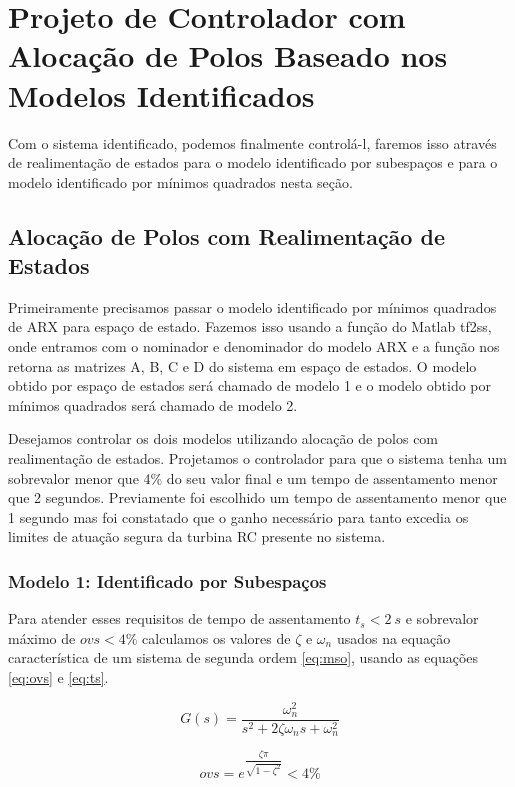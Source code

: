 \chapter{Projeto de Controlador com Alocação de Polos Baseado nos Modelos Identificados} \label{cap5}
Com o sistema identificado, podemos finalmente controlá-l, faremos isso através de realimentação de estados para o modelo identificado por subespaços e para o modelo identificado por mínimos quadrados nesta seção.
\section{Alocação de Polos com Realimentação de Estados}
Primeiramente precisamos passar o modelo identificado por mínimos quadrados de ARX para espaço de estado. Fazemos isso usando a função do Matlab tf2ss, onde entramos com o nominador e denominador do modelo ARX e a função nos retorna as matrizes A, B, C e D do sistema em espaço de estados. O modelo obtido por espaço de estados será chamado de modelo 1 e o modelo obtido por mínimos quadrados será chamado de modelo 2.


Desejamos controlar os dois modelos utilizando alocação de polos com realimentação de estados. Projetamos o controlador para que o sistema tenha um sobrevalor menor que 4\% do seu valor final e um tempo de assentamento menor que 2 segundos. Previamente foi escolhido um tempo de assentamento menor que 1 segundo mas foi constatado que o ganho necessário para tanto excedia os limites de atuação segura da turbina RC presente no sistema.

\subsection{Modelo 1: Identificado por Subespaços}

Para atender esses requisitos de tempo de assentamento $t_s<2 ~s$ e sobrevalor máximo de $ovs<4\%$ calculamos os valores de $\zeta$ e $\omega_n$ usados na equação característica de um sistema de segunda ordem \eqref{eq:mso}, usando as equações \eqref{eq:ovs} e \eqref{eq:ts}.

\begin{equation}\label{eq:mso}
G(s)=\dfrac{\omega_n^2}{s^2+2 \zeta \omega_n  s+ \omega_n^2}
\end{equation}

\begin{equation}\label{eq:ovs}
ovs=e^{\dfrac{\zeta \pi}{\sqrt{1-\zeta^2}}}<4\%
\end{equation}

